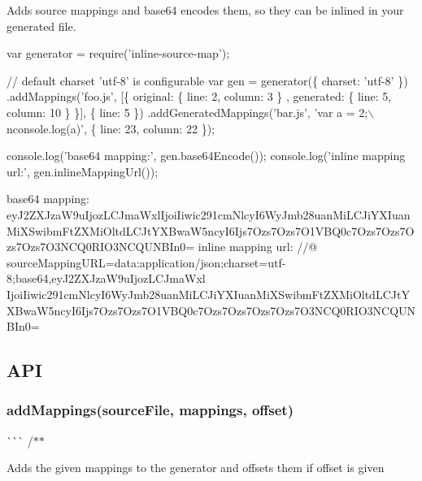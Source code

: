 Adds source mappings and base64 encodes them, so they can be inlined in your generated file.


\begin{DoxyCode}
var generator = require('inline-source-map');

// default charset 'utf-8' is configurable
var gen = generator(\{ charset: 'utf-8' \}) 
  .addMappings('foo.js', [\{ original: \{ line: 2, column: 3 \} , generated: \{ line: 5, column: 10 \} \}], \{
       line: 5 \})
  .addGeneratedMappings('bar.js', 'var a = 2;\(\backslash\)nconsole.log(a)', \{ line: 23, column: 22 \});

console.log('base64 mapping:', gen.base64Encode());
console.log('inline mapping url:', gen.inlineMappingUrl());
\end{DoxyCode}



\begin{DoxyCode}
base64 mapping:
       eyJ2ZXJzaW9uIjozLCJmaWxlIjoiIiwic291cmNlcyI6WyJmb28uanMiLCJiYXIuanMiXSwibmFtZXMiOltdLCJtYXBwaW5ncyI6Ijs7Ozs7Ozs7O1VBQ0c7Ozs7Ozs7Ozs7Ozs7O3NCQ0RIO3NCQUNBIn0=
inline mapping url: //@
       sourceMappingURL=data:application/json;charset=utf-8;base64,eyJ2ZXJzaW9uIjozLCJmaWxl
      IjoiIiwic291cmNlcyI6WyJmb28uanMiLCJiYXIuanMiXSwibmFtZXMiOltdLCJtYXBwaW5ncyI6Ijs7Ozs7Ozs7O1VBQ0c7Ozs7Ozs7Ozs7Ozs7O3NCQ0RIO3NCQUNBIn0=
\end{DoxyCode}


\subsection*{A\+PI}

\subsubsection*{add\+Mappings(source\+File, mappings, offset)}

\`{}\`{}\`{} /$\ast$$\ast$
\begin{DoxyItemize}
\item Adds the given mappings to the generator and offsets them if offset is given
\item 
\item 
\end{DoxyItemize}